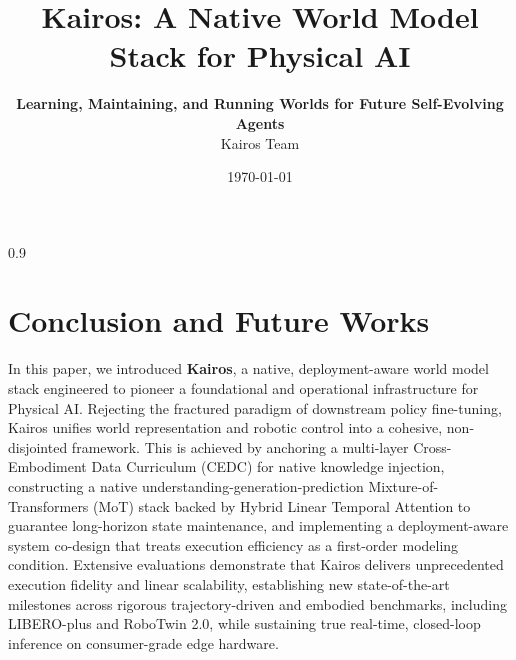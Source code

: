 \documentclass[11pt]{academic_template}
\title{Kairos: A Native World Model Stack for Physical AI}
\author[]{\parbox{\textwidth}{\centering\textbf{Learning, Maintaining, and Running Worlds for Future Self-Evolving Agents}\\[0.5cm]Kairos Team}}
\date{\today}
\theoremstyle{definition}
\begin{document}
\maketitle





\newpage

\begin{spacing}{0.9}
\tableofcontents
\end{spacing}

\newpage












%






\section{Conclusion and Future Works}

In this paper, we introduced \textbf{Kairos}, a native, deployment-aware world model stack engineered to pioneer a foundational and operational infrastructure for Physical AI. Rejecting the fractured paradigm of downstream policy fine-tuning, Kairos unifies world representation and robotic control into a cohesive, non-disjointed framework. This is achieved by anchoring a multi-layer Cross-Embodiment Data Curriculum (CEDC) for native knowledge injection, constructing a native understanding-generation-prediction Mixture-of-Transformers (MoT) stack backed by Hybrid Linear Temporal Attention to guarantee long-horizon state maintenance, and implementing a deployment-aware system co-design that treats execution efficiency as a first-order modeling condition. Extensive evaluations demonstrate that Kairos delivers unprecedented execution fidelity and linear scalability, establishing new state-of-the-art milestones across rigorous trajectory-driven and embodied benchmarks, including LIBERO-plus and RoboTwin 2.0, while sustaining true real-time, closed-loop inference on consumer-grade edge hardware.
\end{document}
